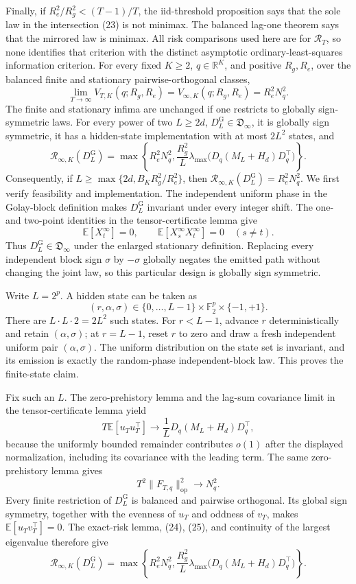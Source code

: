 Finally, if \(R_e^2/R_g^2<(T-1)/T\), the iid-threshold proposition says that the sole law in the intersection (23) is not minimax.  The balanced lag-one theorem says that the mirrored law is minimax.  All risk comparisons used here are for \(\mathcal R_T\), so none identifies that criterion with the distinct asymptotic ordinary-least-squares information criterion.
For every fixed \(K\ge2\), \(q\in\mathbb R^K\), and positive \(R_g,R_e\), over the balanced finite and stationary pairwise-orthogonal classes,
\[
\lim_{T\to\infty}V_{T,K}(q;R_g,R_e)
=V_{\infty,K}(q;R_g,R_e)
=R_e^2N_q^2.
\]
The finite and stationary infima are unchanged if one restricts to globally sign-symmetric laws.  For every power of two \(L\ge2d\), \(D_L^{\mathrm G}\in\mathfrak D_{\infty}\), it is globally sign symmetric, it has a hidden-state implementation with at most \(2L^2\) states, and
\[
\mathcal R_{\infty,K}(D_L^{\mathrm G})
=\max\!\left\{R_e^2N_q^2,\frac{R_g^2}{L}\lambda_{\max}\!\bigl(D_q(M_L+H_d)D_q^{\top}\bigr)\right\}.
\]
Consequently, if \(L\ge\max\{2d,B_KR_g^2/R_e^2\}\), then \(\mathcal R_{\infty,K}(D_L^{\mathrm G})=R_e^2N_q^2\).
We first verify feasibility and implementation.  The independent uniform phase in the Golay-block definition makes \(D_L^{\mathrm G}\) invariant under every integer shift.  The one- and two-point identities in the tensor-certificate lemma give
\[
\mathbb E[X_t^{\infty}]=0,
\qquad
\mathbb E[X_s^{\infty}X_t^{\infty}]=0\quad(s\ne t).
\]
Thus \(D_L^{\mathrm G}\in\mathfrak D_{\infty}\) under the enlarged stationary definition.  Replacing every independent block sign \(\sigma\) by \(-\sigma\) globally negates the emitted path without changing the joint law, so this particular design is globally sign symmetric.

Write \(L=2^p\).  A hidden state can be taken as
\[
(r,\alpha,\sigma)\in\{0,\ldots,L-1\}\times\mathbb F_2^p\times\{-1,+1\}.
\]
There are \(L\cdot L\cdot2=2L^2\) such states.  For \(r<L-1\), advance \(r\) deterministically and retain \((\alpha,\sigma)\); at \(r=L-1\), reset \(r\) to zero and draw a fresh independent uniform pair \((\alpha,\sigma)\).  The uniform distribution on the state set is invariant, and its emission is exactly the random-phase independent-block law.  This proves the finite-state claim.

Fix such an \(L\).  The zero-prehistory lemma and the lag-sum covariance limit in the tensor-certificate lemma yield
\[
T\mathbb E[u_Tu_T^{\top}]
\longrightarrow \frac1L D_q(M_L+H_d)D_q^{\top},
\tag{24}
\]
because the uniformly bounded remainder contributes \(o(1)\) after the displayed normalization, including its covariance with the leading term.  The same zero-prehistory lemma gives
\[
T^2\lVert F_{T,q}\rVert_{\mathrm{op}}^2\longrightarrow N_q^2.
\tag{25}
\]
Every finite restriction of \(D_L^{\mathrm G}\) is balanced and pairwise orthogonal.  Its global sign symmetry, together with the evenness of \(u_T\) and oddness of \(v_T\), makes \(\mathbb E[u_Tv_T^{\top}]=0\).  The exact-risk lemma, (24), (25), and continuity of the largest eigenvalue therefore give
\[
\mathcal R_{\infty,K}(D_L^{\mathrm G})
=\max\!\left\{R_e^2N_q^2,\frac{R_g^2}{L}\lambda_{\max}\!\bigl(D_q(M_L+H_d)D_q^{\top}\bigr)\right\}.
\tag{26}
\]

